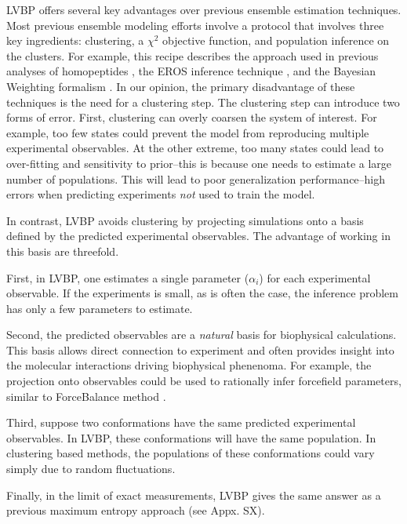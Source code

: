 \documentclass[journal=jacsat,manuscript=article]{achemso}
\begin{document}
LVBP offers several key advantages over previous ensemble estimation techniques.  Most previous ensemble modeling efforts involve a protocol that involves three key ingredients: clustering, a $\chi^2$ objective function, and population inference on the clusters.  For example, this recipe describes the approach used in previous analyses of homopeptides \cite{graf2005}, the EROS inference technique \cite{rozycki2011saxs}, and the Bayesian Weighting formalism \cite{fisher2010}.  In our opinion, the primary disadvantage of these techniques is the need for a clustering step.  The clustering step can introduce two forms of error.  First, clustering can overly coarsen the system of interest.  For example, too few states could prevent the model from reproducing multiple experimental observables.  At the other extreme, too many states could lead to over-fitting and sensitivity to prior--this is because one needs to estimate a large number of populations.  This will lead to poor generalization performance--high errors 
when predicting experiments \emph{not} used to train the model.  

In contrast, LVBP avoids clustering by projecting simulations onto a basis defined by the predicted experimental observables.  The advantage of working in this basis are threefold.  

First, in LVBP, one estimates a single parameter ($\alpha_i$) for each experimental observable.  If the experiments is small, as is often the case, the inference problem has only a few parameters to estimate.  

Second, the predicted observables are a \emph{natural} basis for biophysical calculations.  This basis allows direct connection to experiment and often provides insight into the molecular interactions driving biophysical phenenoma.  For example, the projection onto observables could be used to rationally infer forcefield parameters, similar to ForceBalance method \cite{LeePing}.  

Third, suppose two conformations have the same predicted experimental observables.  In LVBP, these conformations will have the same population.  In clustering based methods, the populations of these conformations could vary simply due to random fluctuations.  

Finally, in the limit of exact measurements, LVBP gives the same answer as a previous \cite{chodera2012} maximum entropy approach (see Appx. SX).  
\end{document}
